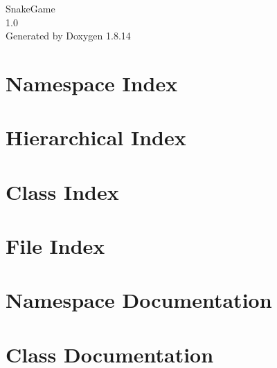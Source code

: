 \documentclass[twoside]{book}
\newcommand{\+}{\discretionary{\mbox{\scriptsize$\hookleftarrow$}}{}{}}
\newcommand{\clearemptydoublepage}{%
  \newpage{\pagestyle{empty}\cleardoublepage}%
}
\begin{document}
\hypersetup{pageanchor=false,
             bookmarksnumbered=true,
             pdfencoding=unicode
            }
\begin{titlepage}
\vspace*{7cm}
\begin{center}%
{\Large Snake\+Game \\[1ex]\large 1.\+0 }\\
\vspace*{1cm}
{\large Generated by Doxygen 1.8.14}\\
\end{center}
\end{titlepage}
\clearemptydoublepage
{}
\tableofcontents
\clearemptydoublepage
{}
\hypersetup{pageanchor=true}

\chapter{Namespace Index}

\chapter{Hierarchical Index}

\chapter{Class Index}

\chapter{File Index}

\chapter{Namespace Documentation}




\chapter{Class Documentation}






















\end{document}
